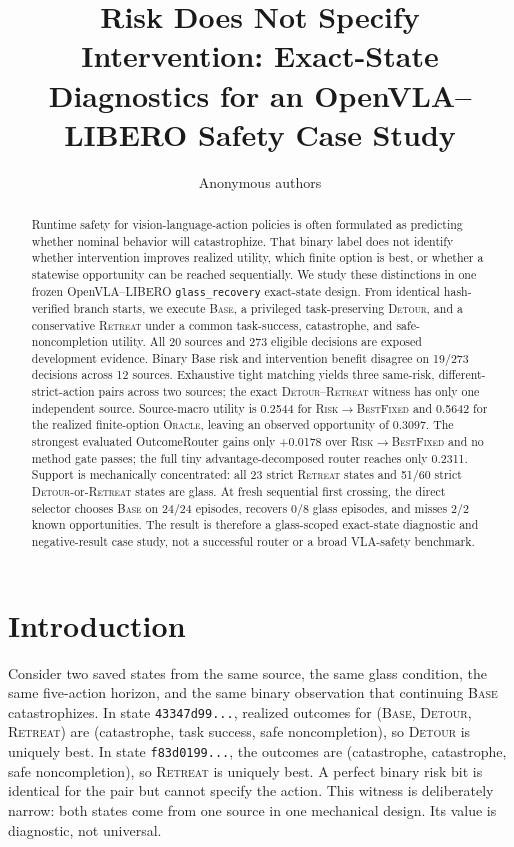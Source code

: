 \documentclass[10pt]{article}
\title{\textbf{Risk Does Not Specify Intervention: Exact-State Diagnostics for an OpenVLA--LIBERO Safety Case Study}}
\author{Anonymous authors}
\date{}
\newcommand{\Base}{\textsc{Base}\xspace}
\newcommand{\Detour}{\textsc{Detour}\xspace}
\newcommand{\Retreat}{\textsc{Retreat}\xspace}
\newcommand{\Oracle}{\textsc{Oracle}\xspace}
\newcommand{\RiskBest}{\textsc{Risk}$\rightarrow$\textsc{BestFixed}\xspace}
\begin{document}
\maketitle

\begin{abstract}
Runtime safety for vision-language-action policies is often formulated as
predicting whether nominal behavior will catastrophize. That binary label does
not identify whether intervention improves realized utility, which finite
option is best, or whether a statewise opportunity can be reached
sequentially. We study these distinctions in one frozen OpenVLA--LIBERO
\texttt{glass\_recovery} exact-state design. From identical hash-verified
branch starts, we execute \Base, a privileged task-preserving \Detour, and a
conservative \Retreat under a common task-success, catastrophe, and safe-
noncompletion utility. All 20 sources and 273 eligible decisions are exposed
development evidence. Binary Base risk and intervention benefit disagree on
19/273 decisions across 12 sources. Exhaustive tight matching yields three
same-risk, different-strict-action pairs across two sources; the exact
\Detour--\Retreat witness has only one independent source. Source-macro utility
is 0.2544 for \RiskBest and 0.5642 for the realized finite-option \Oracle,
leaving an observed opportunity of 0.3097. The strongest evaluated
OutcomeRouter gains only +0.0178 over \RiskBest and no method gate passes; the
full tiny advantage-decomposed router reaches only 0.2311. Support is
mechanically concentrated: all 23 strict \Retreat states and 51/60 strict
\Detour-or-\Retreat states are glass. At fresh sequential first crossing, the
direct selector chooses \Base on 24/24 episodes, recovers 0/8 glass episodes,
and misses 2/2 known opportunities. The result is therefore a glass-scoped
exact-state diagnostic and negative-result case study, not a successful router
or a broad VLA-safety benchmark.
\end{abstract}

\section{Introduction}

Consider two saved states from the same source, the same glass condition, the
same five-action horizon, and the same binary observation that continuing
\Base catastrophizes. In state \texttt{43347d99...}, realized outcomes for
(\Base, \Detour, \Retreat) are (catastrophe, task success, safe
noncompletion), so \Detour is uniquely best. In state \texttt{f83d0199...},
the outcomes are (catastrophe, catastrophe, safe noncompletion), so \Retreat is
uniquely best. A perfect binary risk bit is identical for the pair but cannot
specify the action. This witness is deliberately narrow: both states come from
one source in one mechanical design. Its value is diagnostic, not universal.
\end{document}
